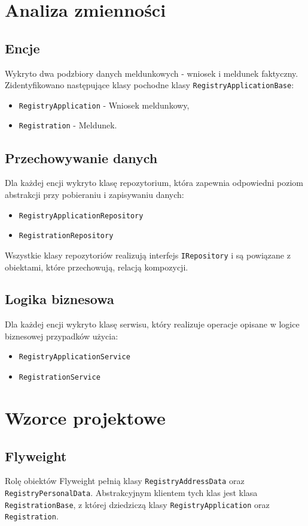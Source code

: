 \documentclass[12pt]{article}
\begin{document}
\newpage

\section{Analiza zmienności}
\subsection{Encje}
Wykryto dwa podzbiory danych meldunkowych - wniosek i meldunek faktyczny.
Zidentyfikowano następujące klasy pochodne klasy \lstinline{RegistryApplicationBase}: 
\begin{itemize}[noitemsep]
    \item \lstinline{RegistryApplication} - Wniosek meldunkowy,
    \item \lstinline{Registration} - Meldunek.
\end{itemize}

\subsection{Przechowywanie danych}
Dla każdej encji wykryto klasę repozytorium, która zapewnia odpowiedni poziom abstrakcji przy pobieraniu i zapisywaniu danych:
\begin{itemize}[noitemsep]
    \item \lstinline{RegistryApplicationRepository}
    \item \lstinline{RegistrationRepository}
\end{itemize}
Wszystkie klasy repozytoriów realizują interfejs \lstinline{IRepository} i są powiązane z obiektami, które przechowują, relacją kompozycji.

\subsection{Logika biznesowa}
Dla każdej encji wykryto klasę serwisu, który realizuje operacje opisane w logice biznesowej przypadków użycia:
\begin{itemize}[noitemsep]
    \item \lstinline{RegistryApplicationService}
    \item \lstinline{RegistrationService}
\end{itemize}


\section{Wzorce projektowe}
\subsection{Flyweight}
Rolę obiektów Flyweight pełnią klasy \lstinline{RegistryAddressData} oraz \lstinline{RegistryPersonalData}. Abstrakcyjnym klientem tych klas jest klasa \lstinline{RegistrationBase}, z której dziedziczą klasy \lstinline{RegistryApplication} oraz \lstinline{Registration}.
\end{document}
